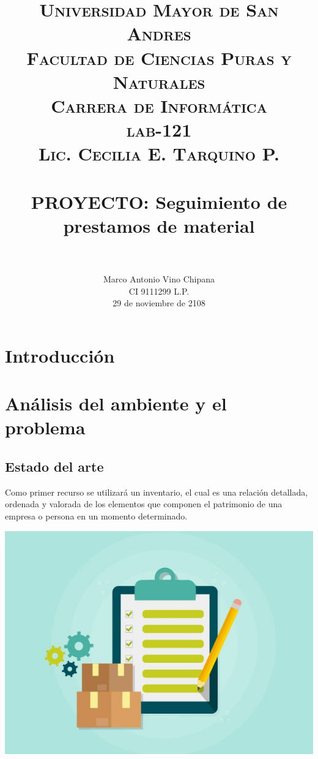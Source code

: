 \documentclass[12pt]{article}
\title{
		\usefont{OT1}{bch}{b}{n}
		\normalfont \normalsize \textsc{Universidad Mayor de San Andres \\
        Facultad de Ciencias Puras y Naturales\\
        Carrera de Informática \\
        lab-121\\
        Lic. Cecilia E. Tarquino P.} \\ [25pt]
		\horrule{0.5pt} \\[0.2cm]
		\huge PROYECTO: Seguimiento de prestamos de material  \\
       \horrule{2pt} \\[0.1cm]
}
\author{
		\normalfont 								\normalsize
        Marco Antonio Vino Chipana	 \\
        CI 9111299 L.P.\\
        29 de noviembre de 2108\\[-3pt]		\normalsize        
}
\date{}
\begin{document}
 
\maketitle 
\thispagestyle{empty}

\newpage
\section{Introducción}
\section{Análisis del ambiente y el problema}
\subsection{Estado del arte}
Como primer recurso se utilizará un inventario, el cual es una relación detallada, ordenada y valorada de los elementos que componen el patrimonio de una empresa o persona en un momento determinado. 
\begin{center}
\vspace{0.5cm}
\includegraphics[scale=0.4]{IMG/inventario.jpg} \\ 
\vspace{0.5cm}
\end{center}
\end{document}
